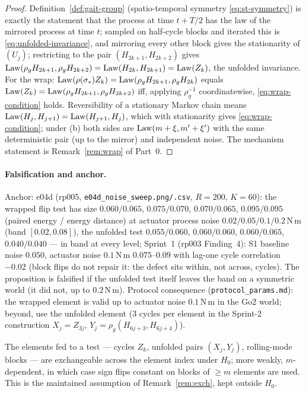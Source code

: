 \begin{proof}
Definition~\ref{def:gait-group} (spatio-temporal symmetry \eqref{eq:st-symmetry})
is exactly the statement that the process at time $t + T/2$ has the law of
the mirrored process at time $t$; sampled on half-cycle blocks and iterated
this is \eqref{eq:unfolded-invariance}, and mirroring every other block gives
the stationarity of $(U_j)$; restricting to the pair $(H_{2k+1}, H_{2k+2})$
gives $\operatorname{Law}(\rho_g H_{2k+1}, \rho_g H_{2k+2}) = \operatorname{Law}(H_{2k}, H_{2k+1}) =
\operatorname{Law}(Z_k)$, the unfolded invariance. For the wrap: $\operatorname{Law}(\rho(\sigma_*)Z_k) =
\operatorname{Law}(\rho_g H_{2k+1}, \rho_g H_{2k})$ equals $\operatorname{Law}(Z_k) = \operatorname{Law}(\rho_g H_{2k+1},
\rho_g H_{2k+2})$ iff, applying $\rho_g^{-1}$ coordinatewise,
\eqref{eq:wrap-condition} holds. Reversibility of a stationary Markov chain
means $\operatorname{Law}(H_{j}, H_{j+1}) = \operatorname{Law}(H_{j+1}, H_{j})$, which with stationarity
gives \eqref{eq:wrap-condition}; under (b) both sides are $\operatorname{Law}(m + \xi,
m' + \xi')$ with the same deterministic pair (up to the mirror) and
independent noise. The mechanism statement is Remark~\ref{rem:wrap} of
Part~0.
\end{proof}

\paragraph{Falsification and anchor.}
Anchor: e04d (rp005, \texttt{e04d\_noise\_sweep.png/.csv}, $R=200$, $K=60$):
the wrapped flip test has size $0.060/0.065$, $0.075/0.070$, $0.070/0.065$,
$0.095/0.095$ (paired energy / energy distance) at actuator process noise
$0.02/0.05/0.1/0.2$\,N\,m (band $[0.02, 0.08]$), the unfolded test
$0.055/0.060$, $0.060/0.060$, $0.060/0.065$, $0.040/0.040$ --- in band at every
level; Sprint~1 (rp003 Finding~4): S1 baseline noise $0.050$, actuator noise
$0.1$\,N\,m $0.075$--$0.09$ with lag-one cycle correlation $-0.02$ (block flips
do not repair it: the defect sits within, not across, cycles). The
proposition is falsified if the unfolded test itself leaves the band on a
symmetric world (it did not, up to $0.2$\,N\,m). Protocol consequence
(\texttt{protocol\_params.md}): the wrapped element is valid up to actuator
noise $0.1$\,N\,m in the Go2 world; beyond, use the unfolded element (3 cycles
per element in the Sprint-2 construction $X_j = Z_{3j}$, $Y_j = \rho_g(H_{6j+3},
H_{6j+4})$).

\begin{assumption}
\label{as:exch}
The elements fed to a test --- cycles $Z_k$, unfolded pairs $(X_j, Y_j)$,
rolling-mode blocks --- are exchangeable across the element index under
$H_0$; more weakly, $m$-dependent, in which case sign flips constant on blocks
of $\ge m$ elements are used. This is the maintained assumption of
Remark~\ref{rem:exch}, kept outside $H_0$.
\end{assumption}

